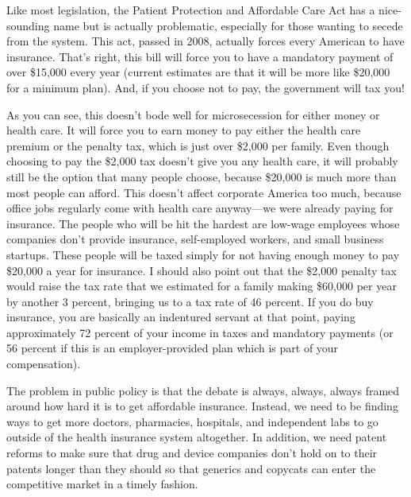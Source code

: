 \begin{policynote}
Like most legislation, the Patient Protection and Affordable Care Act
has a nice-sounding name but is actually problematic,
especially for those wanting to secede from the system. This act,
passed in 2008, actually forces every American to have insurance.
That's right, this bill will force you to have a
mandatory payment of over \$15,000 every year (current estimates are
that it will be more like \$20,000 for a minimum plan). And, if you
choose not to pay, the government will tax you!  

As you can see, this doesn't bode well for
microsecession for either money or health care. It will force you to
earn money to pay either the health care premium or the penalty tax,
which is just over \$2,000 per family. Even though choosing to pay the
\$2,000 tax doesn't give you any health care,
it will probably still be the option that many people
choose, because \$20,000 is much more than most people can afford. 
This doesn't affect corporate America too much,
because office jobs regularly come with health care anyway---we were
already paying for insurance.  The people who will
be hit the hardest are low-wage employees whose companies
don't provide insurance, self-employed workers, and
small business startups.  These people will be taxed simply for not
having enough money to pay \$20,000 a year for insurance.  I should
also point out that the \$2,000 penalty tax would raise the tax rate
that we estimated for a family making \$60,000 per year by another 3
percent, bringing us to a tax rate of 46 percent. If you do buy
insurance, you are basically an indentured servant at that point, paying
approximately 72 percent of your income in taxes and mandatory payments (or 56 percent
if this is an employer-provided plan which is part of your compensation).

The problem in public policy is that the debate is always, always,
always framed around how hard it is to get affordable insurance.
Instead, we need to be finding ways to get more doctors, pharmacies,
hospitals, and independent labs to go outside of the
health insurance system altogether. In addition, we need patent reforms
to make sure that drug and device companies don't hold
on to their patents longer than they should so that generics and
copycats can enter the competitive market in a timely fashion.
\end{policynote}

